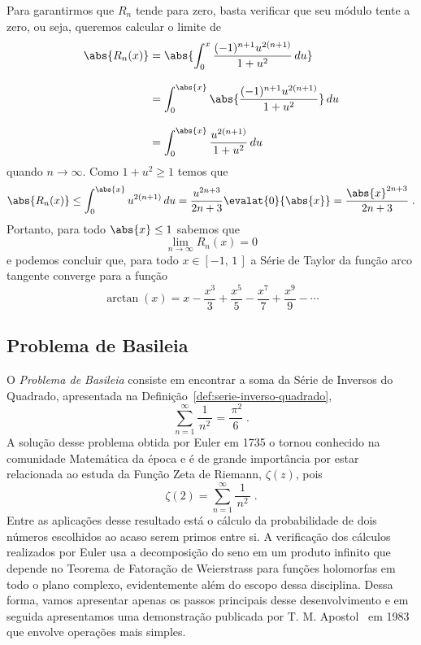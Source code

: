Para garantirmos que $R_n$ tende para zero, basta verificar que seu módulo tente a zero,
ou seja, queremos calcular o limite de
\begin{align*}
    \abs{R_n(x)}
    & = \abs{\int_0^x \frac{(-1)^{n+1} u^{2(n+1)}}{1+u^2} \,du} \\[3mm]
    & = \int_0^{\abs{x}} \abs{\frac{(-1)^{n+1} u^{2(n+1)}}{1+u^2}} \,du \\[3mm]
    & = \int_0^{\abs{x}} \frac{u^{2(n+1)}}{1+u^2} \,du
\end{align*}
quando $n\to\infty$. Como $1+u^2\geq 1$ temos que
\[
  \abs{R_n(x)}
    \leq \int_0^{\abs{x}} u^{2(n+1)} \,du
    = \frac{u^{2n+3}}{2n+3} \evalat{0}{\abs{x}}
    = \frac{\abs{x}^{2n+3}}{2n+3}    \;.
\]
Portanto, para todo $\abs{x} \leq 1$ sabemos que
\[
  \lim_{n\to\infty} R_n(x) = 0
\]
e podemos concluir que, para todo $x\in[-1,\,1\,]$ a Série de Taylor da função
arco tangente converge para a função
\[
  \arctan(x) = x - \frac{x^3}{3}
  + \frac{x^5}{5}
  - \frac{x^7}{7}
  + \frac{x^9}{9}
  - \cdots
\]

\subsection{Problema de Basileia}
\label{subsec:problema-Basileia}

O \emph{Problema de Basileia} consiste em
encontrar a soma da Série de Inversos do Quadrado,
apresentada na Definição~\ref{def:serie-inverso-quadrado},
\[
  \sum_{n=1}^\infty \frac{1}{\,n^2\,} = \frac{\,\pi^2}{6}    \;.
\]
A solução desse problema obtida por Euler em 1735 o tornou conhecido na comunidade
Matemática da época e é de grande importância
por estar relacionada ao estuda da Função Zeta de Riemann, $\zeta(z)$,
pois
\[
  \zeta(2) = \sum_{n=1}^\infty \frac{1}{\,n^2\,}    \;.
\]
Entre as aplicações desse resultado está o cálculo da probabilidade de dois
números escolhidos ao acaso serem primos entre si.
A verificação dos cálculos realizados por Euler usa a decomposição do seno
em um produto infinito que depende no Teorema de Fatoração de Weierstrass
para funções holomorfas
em todo o plano complexo, evidentemente além do escopo dessa disciplina.
Dessa forma, vamos apresentar apenas os passos principais desse desenvolvimento
e em seguida apresentamos uma demonstração
publicada por T. M. Apostol~\cite{Apostol-Proof-Euler-Missed} em 1983
que envolve operações mais simples.

